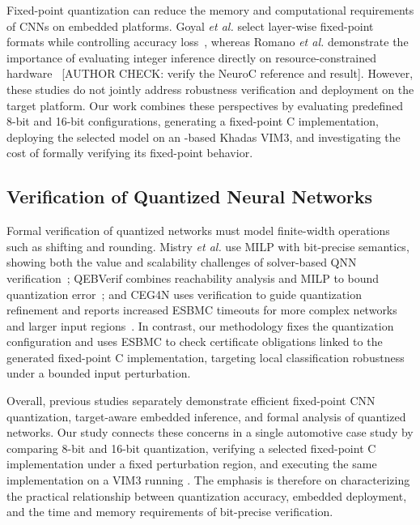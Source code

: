Fixed-point quantization can reduce the memory and computational requirements of CNNs on embedded platforms. Goyal \emph{et al.} select layer-wise fixed-point formats while controlling accuracy loss~\cite{Goyal2021FixedPointCNN}, whereas Romano \emph{et al.} demonstrate the importance of evaluating integer inference directly on resource-constrained hardware~\cite{Romano2026NeuroC} [AUTHOR CHECK: verify the NeuroC reference and result]. However, these studies do not jointly address robustness verification and deployment on the target platform. Our work combines these perspectives by evaluating predefined 8-bit and 16-bit configurations, generating a fixed-point C implementation, deploying the selected model on an \AAOS{}-based Khadas VIM3, and investigating the cost of formally verifying its fixed-point behavior.

\subsection{Verification of Quantized Neural Networks}


Formal verification of quantized networks must model finite-width operations such as shifting and rounding. Mistry \emph{et al.} use MILP with bit-precise semantics, showing both the value and scalability challenges of solver-based QNN verification~\cite{Mistry2022MILP}; QEBVerif combines reachability analysis and MILP to bound quantization error~\cite{Zhang2023QEBVerif}; and CEG4N uses verification to guide quantization refinement and reports increased ESBMC timeouts for more complex networks and larger input regions~\cite{Matos2022CEG4N}. In contrast, our methodology fixes the quantization configuration and uses ESBMC to check certificate obligations linked to the generated fixed-point C implementation, targeting local classification robustness under a bounded input perturbation.

Overall, previous studies separately demonstrate efficient fixed-point CNN quantization, target-aware embedded inference, and formal analysis of quantized networks. Our study connects these concerns in a single automotive case study by comparing 8-bit and 16-bit quantization, verifying a selected fixed-point C implementation under a fixed perturbation region, and executing the same implementation on a VIM3 running \AAOS{}. The emphasis is therefore on characterizing the practical relationship between quantization accuracy, embedded deployment, and the time and memory requirements of bit-precise verification.

